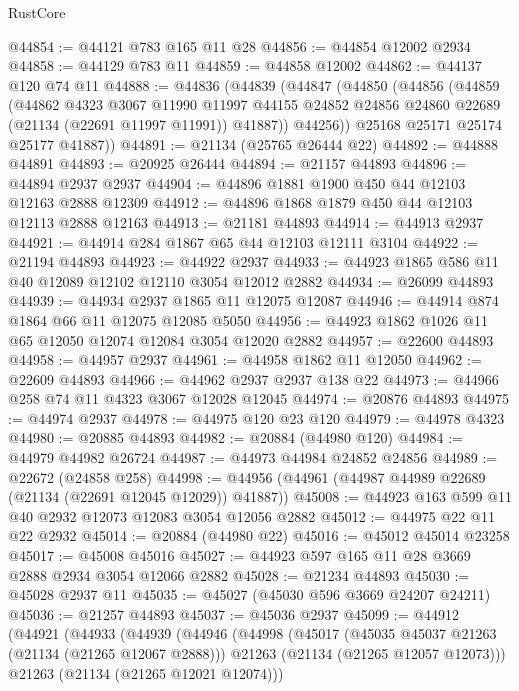 \begin{lexlean}{RustCore}
\begin{coremodule}
@44854 := @44121 @783 @165 @11 @28
@44856 := @44854 @12002 @2934
@44858 := @44129 @783 @11
@44859 := @44858 @12002
@44862 := @44137 @120 @74 @11
@44888 := @44836
    (@44839
      (@44847
        (@44850
          (@44856
            (@44859
              (@44862
                @4323
                @3067
                @11990
                @11997
                @44155
                @24852
                @24856
                @24860
                @22689
                (@21134 (@22691 @11997 @11991))
                @41887))
            @44256))
        @25168
        @25171
        @25174
        @25177
        @41887))
@44891 := @21134 (@25765 @26444 @22)
@44892 := @44888 @44891
@44893 := @20925 @26444
@44894 := @21157 @44893
@44896 := @44894 @2937 @2937
@44904 := @44896 @1881 @1900 @450 @44 @12103 @12163 @2888 @12309
@44912 := @44896 @1868 @1879 @450 @44 @12103 @12113 @2888 @12163
@44913 := @21181 @44893
@44914 := @44913 @2937
@44921 := @44914 @284 @1867 @65 @44 @12103 @12111 @3104
@44922 := @21194 @44893
@44923 := @44922 @2937
@44933 := @44923 @1865 @586 @11 @40 @12089 @12102 @12110 @3054 @12012 @2882
@44934 := @26099 @44893
@44939 := @44934 @2937 @1865 @11 @12075 @12087
@44946 := @44914 @874 @1864 @66 @11 @12075 @12085 @5050
@44956 := @44923 @1862 @1026 @11 @65 @12050 @12074 @12084 @3054 @12020 @2882
@44957 := @22600 @44893
@44958 := @44957 @2937
@44961 := @44958 @1862 @11 @12050
@44962 := @22609 @44893
@44966 := @44962 @2937 @2937 @138 @22
@44973 := @44966 @258 @74 @11 @4323 @3067 @12028 @12045
@44974 := @20876 @44893
@44975 := @44974 @2937
@44978 := @44975 @120 @23 @120
@44979 := @44978 @4323
@44980 := @20885 @44893
@44982 := @20884 (@44980 @120)
@44984 := @44979 @44982 @26724
@44987 := @44973 @44984 @24852 @24856
@44989 := @22672 (@24858 @258)
@44998 := @44956 (@44961 (@44987 @44989 @22689 (@21134 (@22691 @12045 @12029)) @41887))
@45008 := @44923 @163 @599 @11 @40 @2932 @12073 @12083 @3054 @12056 @2882
@45012 := @44975 @22 @11 @22 @2932
@45014 := @20884 (@44980 @22)
@45016 := @45012 @45014 @23258
@45017 := @45008 @45016
@45027 := @44923 @597 @165 @11 @28 @3669 @2888 @2934 @3054 @12066 @2882
@45028 := @21234 @44893
@45030 := @45028 @2937 @11
@45035 := @45027 (@45030 @596 @3669 @24207 @24211)
@45036 := @21257 @44893
@45037 := @45036 @2937
@45099 := @44912
    (@44921
      (@44933
        (@44939
          (@44946
            (@44998
              (@45017
                (@45035 @45037 @21263 (@21134 (@21265 @12067 @2888)))
                @21263
                (@21134 (@21265 @12057 @12073)))
              @21263
              (@21134 (@21265 @12021 @12074)))

\end{coremodule}
\end{lexlean}
